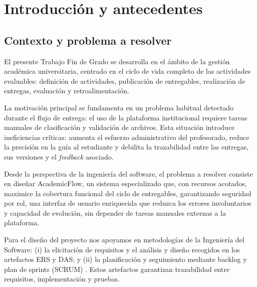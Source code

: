 \chapter{Introducci\'on y antecedentes}\label{cap_intro}
\makeatletter
{}
\makeatother

\FloatBarrier
\section{Contexto y problema a resolver}

El presente Trabajo Fin de Grado se desarrolla en el \'ambito de la gesti\'on acad\'emica universitaria, centrado en el ciclo de vida completo de las actividades evaluables: definici\'on de actividades, publicaci\'on de entregables, realizaci\'on de entregas, evaluaci\'on y retroalimentaci\'on.

La motivaci\'on principal se fundamenta en un problema habitual detectado durante el flujo de entrega: el uso de la plataforma institucional requiere tareas manuales de clasificaci\'on y validaci\'on de archivos. Esta situaci\'on introduce ineficiencias cr\'iticas: aumenta el esfuerzo administrativo del profesorado, reduce la precisi\'on en la gu\'ia al estudiante y debilita la trazabilidad entre las entregas, sus versiones y el \emph{feedback} asociado.

Desde la perspectiva de la ingenier\'ia del software, el problema a resolver consiste en dise\~nar AcademicFlow, un sistema especializado que, con recursos acotados, maximice la cobertura funcional del ciclo de entregables, garantizando seguridad por rol, una interfaz de usuario enriquecida que reduzca los errores involuntarios y capacidad de evoluci\'on, sin depender de tareas manuales externas a la plataforma.

Para el dise\~no del proyecto nos apoyamos en metodolog\'ias de la Ingenier\'ia del Software: (i) la elicitaci\'on de requisitos y el an\'alisis y dise\~no recogidos en los artefactos ERS y DAS; y (ii) la planificaci\'on y seguimiento mediante backlog y plan de sprints (SCRUM) \cite{scrumguide}. Estos artefactos garantizan trazabilidad entre requisitos, implementaci\'on y pruebas.

